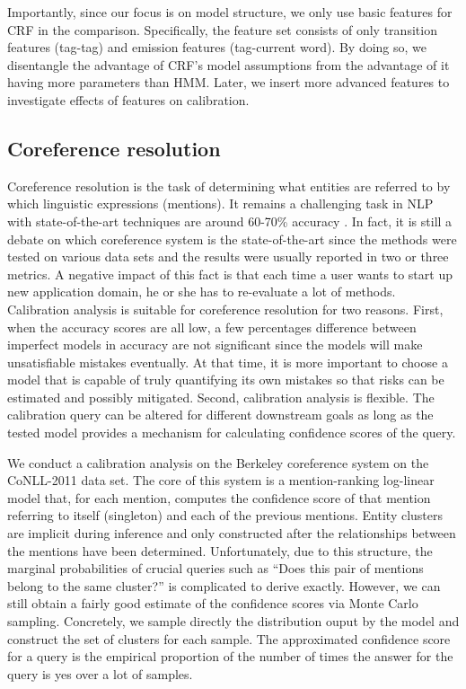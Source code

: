 Importantly, since our focus is on model structure, we only use basic features for CRF in the comparison. Specifically, the feature set consists of only transition features (tag-tag) and emission features (tag-current word). By doing so, we disentangle the advantage of CRF's model assumptions from the advantage of it having more parameters than HMM. Later, we insert more advanced features to investigate effects of features on calibration. 

\subsection{Coreference resolution}

Coreference resolution is the task of determining what entities are referred to by which linguistic expressions (mentions). It remains a challenging task in NLP with state-of-the-art techniques are around 60-70\% accuracy \cite{durrett2013easy, yang2015hierarchical}. In fact, it is still a debate on which coreference system is the state-of-the-art since the methods were tested on various data sets and the results were usually reported in two or three metrics. A negative impact of this fact is that each time a user wants to start up new application domain, he or she has to re-evaluate a lot of methods. Calibration analysis is suitable for coreference resolution for two reasons. First, when the accuracy scores are all low, a few percentages difference between imperfect models in accuracy are not significant since the models will make unsatisfiable mistakes eventually. At that time, it is more important to choose a model that is capable of truly quantifying its own mistakes so that risks can be estimated and possibly mitigated. Second, calibration analysis is flexible. The calibration query can be altered for different downstream goals as long as the tested model provides a mechanism for calculating confidence scores of the query. 

We conduct a calibration analysis on the Berkeley coreference system \citep{durrett2013easy} on the CoNLL-2011 data set. The core of this system is a mention-ranking log-linear model that, for each mention, computes the confidence score of that mention referring to itself (singleton) and each of the previous mentions. Entity clusters are implicit during inference and only constructed after the relationships between the mentions have been determined. Unfortunately, due to this structure, the marginal probabilities of crucial queries such as ``Does this pair of mentions belong to the same cluster?'' is complicated to derive exactly. However, we can still obtain a fairly good estimate of the confidence scores via Monte Carlo sampling. Concretely, we sample directly the distribution ouput by the model and construct the set of clusters for each sample. The approximated confidence score for a query is the empirical proportion of the number of times the answer for the query is yes over a lot of samples. 


